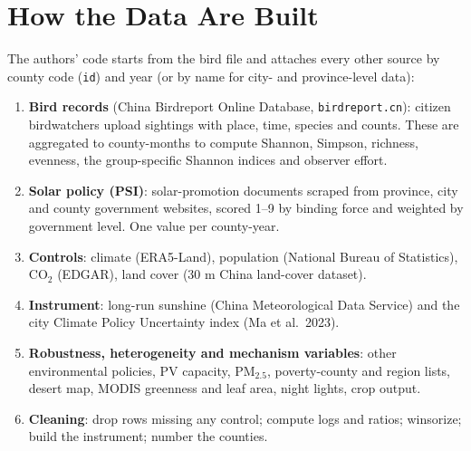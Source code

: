 \documentclass[10pt]{article}
\begin{document}
\section{How the Data Are Built}
The authors' code starts from the bird file and attaches every other source by county code (\texttt{id}) and year (or by name for city- and province-level data):
\begin{enumerate}[leftmargin=16pt]
\item \textbf{Bird records} (China Birdreport Online Database, \texttt{birdreport.cn}): citizen birdwatchers upload sightings with place, time, species and counts. These are aggregated to county-months to compute Shannon, Simpson, richness, evenness, the group-specific Shannon indices and observer effort.
\item \textbf{Solar policy (PSI)}: solar-promotion documents scraped from province, city and county government websites, scored 1--9 by binding force and weighted by government level. One value per county-year.
\item \textbf{Controls}: climate (ERA5-Land), population (National Bureau of Statistics), CO$_2$ (EDGAR), land cover (30 m China land-cover dataset).
\item \textbf{Instrument}: long-run sunshine (China Meteorological Data Service) and the city Climate Policy Uncertainty index (Ma et al.\ 2023).
\item \textbf{Robustness, heterogeneity and mechanism variables}: other environmental policies, PV capacity, PM$_{2.5}$, poverty-county and region lists, desert map, MODIS greenness and leaf area, night lights, crop output.
\item \textbf{Cleaning}: drop rows missing any control; compute logs and ratios; winsorize; build the instrument; number the counties.
\end{enumerate}
\end{document}

